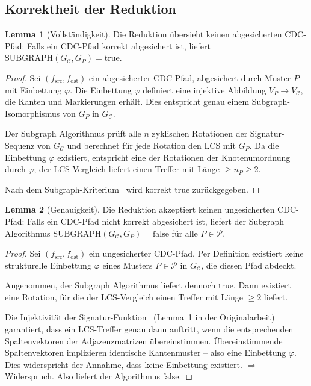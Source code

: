﻿\documentclass[a4paper,12pt]{article}
\theoremstyle{definition}
\newtheorem{lemma}{Lemma}
\begin{document}
	\subsection{Korrektheit der Reduktion}
	
	\begin{lemma}[Vollst\"andigkeit]
		\label{lem:vollstaendigkeit}
		Die Reduktion \"ubersieht keinen abgesicherten CDC-Pfad:
		Falls ein CDC-Pfad korrekt abgesichert ist, liefert $\mathrm{SUBGRAPH}(G_{\mathcal{C}}, G_P) = \mathrm{true}$.
	\end{lemma}
	
	\begin{proof}
		Sei $(f_{\mathrm{src}}, f_{\mathrm{dst}})$ ein abgesicherter CDC-Pfad,
		abgesichert durch Muster $P$ mit Einbettung $\varphi$.
		Die Einbettung $\varphi$ definiert eine injektive Abbildung
		$V_P \to V_{\mathcal{C}}$, die Kanten und Markierungen erh\"alt.
		Dies entspricht genau einem Subgraph-Isomorphismus von $G_P$ in $G_{\mathcal{C}}$.
		
		Der Subgraph Algorithmus pr\"uft alle $n$ zyklischen Rotationen der
		Signatur-Sequenz von $G_{\mathcal{C}}$ und berechnet f\"ur jede Rotation den LCS
		mit $G_P$. Da die Einbettung $\varphi$ existiert, entspricht eine der
		Rotationen der Knotenumordnung durch $\varphi$; der LCS-Vergleich liefert
		einen Treffer mit L\"ange $\geq n_P \geq 2$.
		
		Nach dem Subgraph-Kriterium~\cite{epp2026subgraph} wird korrekt
		$\mathrm{true}$ zur\"uckgegeben.
	\end{proof}
	
	\begin{lemma}[Genauigkeit]
		\label{lem:genauigkeit}
		Die Reduktion akzeptiert keinen ungesicherten CDC-Pfad:
		Falls ein CDC-Pfad nicht korrekt abgesichert ist, liefert der Subgraph
		Algorithmus $\mathrm{SUBGRAPH}(G_{\mathcal{C}}, G_P) = \mathrm{false}$
		f\"ur alle $P \in \mathcal{P}$.
	\end{lemma}
	
	\begin{proof}
		Sei $(f_{\mathrm{src}}, f_{\mathrm{dst}})$ ein ungesicherter CDC-Pfad.
		Per Definition existiert keine strukturelle Einbettung $\varphi$
		eines Musters $P \in \mathcal{P}$ in $G_{\mathcal{C}}$, die diesen Pfad
		abdeckt.
		
		Angenommen, der Subgraph Algorithmus liefert dennoch $\mathrm{true}$.
		Dann existiert eine Rotation, f\"ur die der LCS-Vergleich einen Treffer
		mit L\"ange $\geq 2$ liefert.
		
		Die Injektivit\"at der Signatur-Funktion~\cite{epp2026subgraph}
		(Lemma~1 in der Originalarbeit) garantiert, dass ein LCS-Treffer genau
		dann auftritt, wenn die entsprechenden Spaltenvektoren der Adjazenzmatrizen
		\"ubereinstimmen. \"Ubereinstimmende Spaltenvektoren implizieren
		identische Kantenmuster -- also eine Einbettung $\varphi$.
		Dies widerspricht der Annahme, dass keine Einbettung existiert.
		$\Rightarrow$ Widerspruch. Also liefert der Algorithmus $\mathrm{false}$.
	\end{proof}
	
\end{document}
